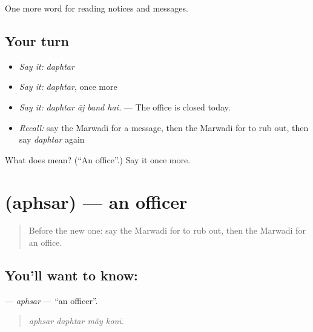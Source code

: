 \begin{grammarlens}[title={What you've built}]
One more word for reading notices and messages.
\end{grammarlens}

\subsection*{Your turn}
\begin{itemize}
\raggedright
  \item \emph{Say it:} \emph{daphtar}
  \item \emph{Say it:} \emph{daphtar}, once more
  \item \emph{Say it:} \emph{daphtar āj band hai.} — The office is closed today.
  \item \emph{Recall:} say the Marwadi for a message, then the Marwadi for to rub out, then say \emph{daphtar} again
\end{itemize}

\begin{tcolorbox}[breakable,colback=teal!4,colframe=teal!35!black,title={Before you move on}]
What does  mean? (\textquotedblleft{}An office\textquotedblright{}.) Say it once more.
\end{tcolorbox}
\section[\texorpdfstring{\mw{अफसर} (aphsar)}{अफसर (aphsar)}]{ (aphsar) — an officer}

\label{lesson:MW-C198-aphsar}



\begin{quote}
Before the new one: say the Marwadi for to rub out, then the Marwadi for an office.
\end{quote}

\subsection*{You'll want to know: }
\textbf{} — \emph{aphsar} — \textquotedblleft{}an officer\textquotedblright{}.

\begin{quote}
   
\end{quote}

\begin{quote}
\emph{aphsar daphtar mā̃y konī.}
\end{quote}

